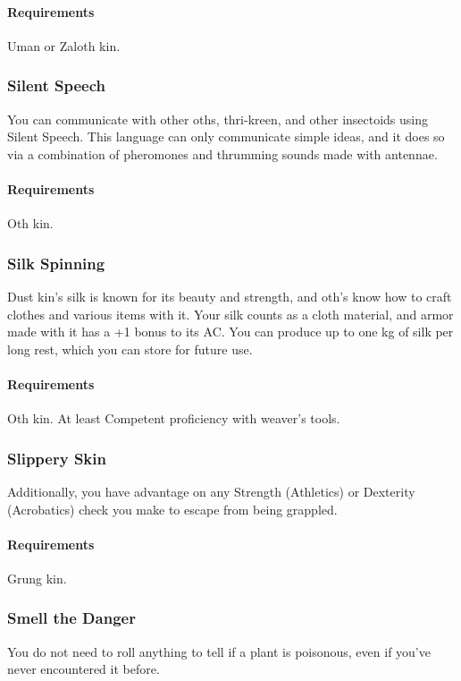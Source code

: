     \paragraph{Requirements} Uman or Zaloth kin.
\subsubsection{Silent Speech} \label{feat::silentspeech}
    You can communicate with other oths, thri-kreen, and other insectoids using Silent Speech.
    This language can only communicate simple ideas, and it does so via a combination of pheromones and thrumming sounds made with antennae.
    \paragraph{Requirements} Oth kin.
\subsubsection{Silk Spinning} \label{feat::silkspinning}
    Dust kin's silk is known for its beauty and strength, and oth's know how to craft clothes and various items with it.
    Your silk counts as a cloth material, and armor made with it has a +1 bonus to its AC.
    You can produce up to one kg of silk per long rest, which you can store for future use.
    \paragraph{Requirements} Oth kin. At least Competent proficiency with weaver's tools.
\subsubsection{Slippery Skin} \label{feat::slipperyskin}
    Additionally, you have advantage on any Strength (Athletics) or Dexterity (Acrobatics) check you make to escape from being grappled.
    \paragraph{Requirements} Grung kin.
\subsubsection{Smell the Danger} \label{feat::smellthedanger}
    You do not need to roll anything to tell if a plant is poisonous, even if you've never encountered it before.

